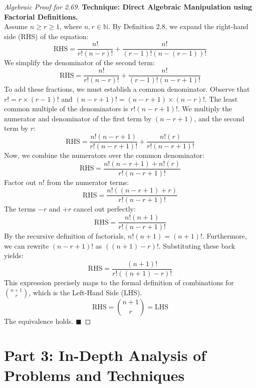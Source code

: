 \documentclass[11pt]{article}
\theoremstyle{definition}
\theoremstyle{plain}
\theoremstyle{remark}
\newcommand{\N}{\mathbb{N}}
\begin{document}
\begin{proof}[Algebraic Proof for 2.69]
\textbf{Technique: Direct Algebraic Manipulation using Factorial Definitions.} \\
Assume $n \ge r \ge 1$, where $n, r \in \N$. By Definition 2.8, we expand the right-hand side (RHS) of the equation:
\[
\text{RHS} = \frac{n!}{r!(n-r)!} + \frac{n!}{(r-1)!(n-(r-1))!}
\]
We simplify the denominator of the second term:
\[
\text{RHS} = \frac{n!}{r!(n-r)!} + \frac{n!}{(r-1)!(n-r+1)!}
\]
To add these fractions, we must establish a common denominator. Observe that $r! = r \times (r-1)!$ and $(n-r+1)! = (n-r+1) \times (n-r)!$. 
The least common multiple of the denominators is $r!(n-r+1)!$. 
We multiply the numerator and denominator of the first term by $(n-r+1)$, and the second term by $r$:
\[
\text{RHS} = \frac{n!(n-r+1)}{r!(n-r+1)!} + \frac{n!(r)}{r!(n-r+1)!}
\]
Now, we combine the numerators over the common denominator:
\[
\text{RHS} = \frac{n!(n-r+1) + n!(r)}{r!(n-r+1)!}
\]
Factor out $n!$ from the numerator terms:
\[
\text{RHS} = \frac{n! \left( (n-r+1) + r \right)}{r!(n-r+1)!}
\]
The terms $-r$ and $+r$ cancel out perfectly:
\[
\text{RHS} = \frac{n! (n+1)}{r!(n-r+1)!}
\]
By the recursive definition of factorials, $n!(n+1) = (n+1)!$. Furthermore, we can rewrite $(n-r+1)!$ as $((n+1)-r)!$. Substituting these back yields:
\[
\text{RHS} = \frac{(n+1)!}{r!((n+1)-r)!}
\]
This expression precisely maps to the formal definition of combinations for $\binom{n+1}{r}$, which is the Left-Hand Side (LHS).
\[
\text{RHS} = \binom{n+1}{r} = \text{LHS}
\]
The equivalence holds. $\blacksquare$
\end{proof}

\newpage
\section{Part 3: In-Depth Analysis of Problems and Techniques}
\end{document}
